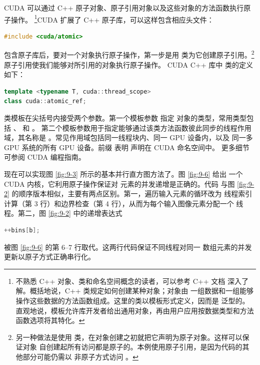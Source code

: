 CUDA 可以通过 C++ 原子对象、原子引用对象以及这些对象的方法函数执行原子操作。
\footnote{不熟悉 C++ 对象、类和命名空间概念的读者，可以参考 C++ 文档
\cite{cppreference2025} 深入了解。概括地说，C++ 类规定如何创建某种对象；对象由
一组数据和一组能够操作这些数据的方法函数组成。这里的类以模板形式定义，因而是
泛型的。直观地说，模板允许库开发者给出通用对象，再由用户应用按数据类型和方法
函数选项将其特化。}CUDA 扩展了 C++ 原子库，可以这样包含相应头文件：

\begin{lstlisting}[language=C++,numbers=none]
#include <cuda/atomic>
\end{lstlisting}

包含原子库后，要对一个对象执行原子操作，第一步是用
 类为它创建原子引用。\footnote{另一种做法是使用
 类，在对象创建之初就把它声明为原子对象。这样可以保证对象
自创建起所有访问都是原子的。本例使用原子引用，是因为代码的其他部分可能仍需以
非原子方式访问 。}原子引用使我们能够对所引用的对象执行原子操作。
CUDA C++ 库中  类的定义如下：

\begin{lstlisting}[language=C++,numbers=none]
template <typename T, cuda::thread_scope>
class cuda::atomic_ref;
\end{lstlisting}

 类模板在尖括号内接受两个参数。第一个模板参数  指定
对象的类型，常用类型包括 、 和 。
第二个模板参数用于指定能够通过该类方法函数彼此同步的线程作用域，其名称是
。常见作用域包括同一线程块内、同一 GPU 设备内，以及
同一多 GPU 系统的所有 GPU 设备。前缀  表明 
声明在 CUDA 命名空间中。
更多细节可参阅 CUDA 编程指南。

现在可以实现图 \ref{fig:9-3} 所示的基本并行直方图方法了。图 \ref{fig:9-6} 给出
一个 CUDA 内核，它利用原子操作保证对  元素的并发递增是正确的。代码
与图 \ref{fig:9-2} 的顺序版本相似，主要有两点区别。第一，遍历输入元素的循环改为
线程索引计算（第 3 行）和边界检查（第 4 行），从而为每个输入图像元素分配一个
线程。第二，图 \ref{fig:9-2} 中的递增表达式

\begin{lstlisting}[language=C++,numbers=none]
++bins[b];
\end{lstlisting}

被图 \ref{fig:9-6} 的第 6--7 行取代。这两行代码保证不同线程对同一 
数组元素的并发更新以原子方式正确串行化。

